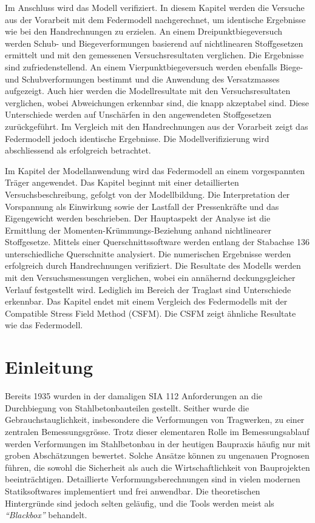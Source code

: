 \documentclass[
  11pt,
  letterpaper,
]{scrreprt}
\renewcommand*\contentsname{Inhaltsverzeichnis}
\newcommand\contentsname{Inhaltsverzeichnis}
\begin{document}
Im Anschluss wird das Modell verifiziert. In diesem Kapitel werden die Versuche aus der Vorarbeit mit dem Federmodell nachgerechnet, um identische Ergebnisse wie bei den Handrechnungen zu erzielen. An einem Dreipunktbiegeversuch werden Schub- und Biegeverformungen basierend auf nichtlinearen Stoffgesetzen ermittelt und mit den gemessenen Versuchsresultaten verglichen. Die Ergebnisse sind zufriedenstellend. An einem Vierpunktbiegeversuch werden ebenfalls Biege- und Schubverformungen bestimmt und die Anwendung des Versatzmasses aufgezeigt. Auch hier werden die Modellresultate mit den Versuchsresultaten verglichen, wobei Abweichungen erkennbar sind, die knapp akzeptabel sind. Diese Unterschiede werden auf Unschärfen in den angewendeten Stoffgesetzen zurückgeführt. Im Vergleich mit den Handrechnungen aus der Vorarbeit zeigt das Federmodell jedoch identische Ergebnisse. Die Modellverifizierung wird abschliessend als erfolgreich betrachtet.

Im Kapitel der Modellanwendung wird das Federmodell an einem vorgespannten Träger angewendet. Das Kapitel beginnt mit einer detaillierten Versuchsbeschreibung, gefolgt von der Modellbildung. Die Interpretation der Vorspannung als Einwirkung sowie der Lastfall der Pressenkräfte und das Eigengewicht werden beschrieben. Der Hauptaspekt der Analyse ist die Ermittlung der Momenten-Krümmungs-Beziehung anhand nichtlinearer Stoffgesetze. Mittels einer Querschnittssoftware werden entlang der Stabachse 136 unterschiedliche Querschnitte analysiert. Die numerischen Ergebnisse werden erfolgreich durch Handrechnungen verifiziert. Die Resultate des Modells werden mit den Versuchsmessungen verglichen, wobei ein annähernd deckungsgleicher Verlauf festgestellt wird. Lediglich im Bereich der Traglast sind Unterschiede erkennbar. Das Kapitel endet mit einem Vergleich des Federmodells mit der Compatible Stress Field Method (CSFM). Die CSFM zeigt ähnliche Resultate wie das Federmodell.

\renewcommand*\contentsname{Inhaltsverzeichnis}
{
\hypersetup{linkcolor=}
\setcounter{tocdepth}{1}
\tableofcontents
}
\listoffigures
{}

\chapter{Einleitung}\label{einleitung}

Bereits 1935 wurden in der damaligen SIA 112 Anforderungen an die
Durchbiegung von Stahlbetonbauteilen gestellt. Seither wurde die
Gebrauchstauglichkeit, insbesondere die Verformungen von Tragwerken, zu
einer zentralen Bemessungsgrösse. Trotz dieser elementaren Rolle im
Bemessungsablauf werden Verformungen im Stahlbetonbau in der heutigen
Baupraxis häufig nur mit groben Abschätzungen bewertet. Solche Ansätze
können zu ungenauen Prognosen führen, die sowohl die Sicherheit als auch
die Wirtschaftlichkeit von Bauprojekten beeinträchtigen. Detaillierte
Verformungsberechnungen sind in vielen modernen Statiksoftwares
implementiert und frei anwendbar. Die theoretischen Hintergründe sind
jedoch selten geläufig, und die Tools werden meist als
\emph{``Blackbox''} behandelt.
\end{document}
